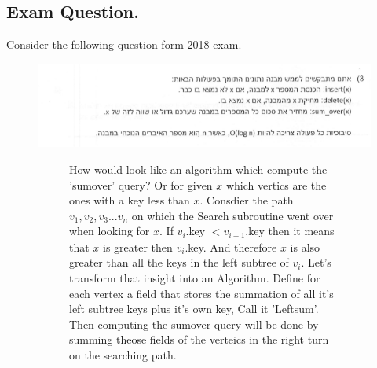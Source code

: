 \newpage
\fi
\subsection{Exam Question.}
Consider the following question form 2018 exam. 
\begin{figure}[h]
  \centering
  \includegraphics[scale=0.8]{avl-q-exam.png}\\
\end{figure}
\begin{figure}[h]
  \begin{subfigure}[t]{0.49\textwidth}
How would look like an algorithm which compute the 'sumover' query? Or for given $x$ which vertics are the ones with a key less than $x$. 
Consdier the path $v_1,v_2,v_3...v_n$ on which the Search subroutine went over when looking for $x$. If $v_i$.key $ <  v_{i+1}$.key then it means that $x$ is 
greater then $v_{i}$.key. And therefore $x$ is also greater than all the keys in the left subtree of $v_{i}$. Let's transform that insight into an 
Algorithm. Define for each vertex a field that stores the summation of all it's left subtree keys plus it's own key, Call it 'Leftsum'.  
Then computing the sumover query will be done by summing theose fields of the verteics in the right turn on the searching path. 


\end{subfigure}
\end{figure}
